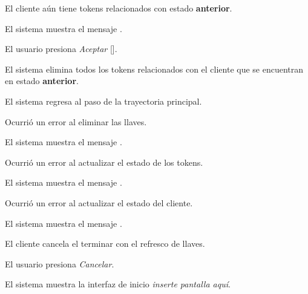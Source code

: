 {\begin{trayectoriaAlternativa}
  \end{trayectoriaAlternativa}

  \begin{trayectoriaAlternativa}
    {El cliente aún tiene tokens relacionados con estado \textbf{anterior}.}

    \item El sistema muestra el mensaje
      .

    \item El usuario presiona \textit{Aceptar}
      [].

    \item El sistema elimina todos los tokens relacionados con el cliente que se
      encuentran en estado \textbf{anterior}.

    \item El sistema regresa al paso  de la trayectoria
      principal.

  \end{trayectoriaAlternativa}

  \begin{trayectoriaAlternativa}
    {Ocurrió un error al eliminar las llaves.}

    \item El sistema muestra el mensaje
      .

  \end{trayectoriaAlternativa}

  \begin{trayectoriaAlternativa}
    {Ocurrió un error al actualizar el estado de los tokens.}

    \item El sistema muestra el mensaje
      .

  \end{trayectoriaAlternativa}

  \begin{trayectoriaAlternativa}
    {Ocurrió un error al actualizar el estado del cliente.}

    \item El sistema muestra el mensaje
      .

  \end{trayectoriaAlternativa}

  \begin{trayectoriaAlternativa}
    {El cliente cancela el terminar con el refresco de llaves.}

    \item El usuario presiona \textit{Cancelar}.

    \item El sistema muestra la interfaz de inicio
      \textit{inserte pantalla aquí}.

  \end{trayectoriaAlternativa}
}
